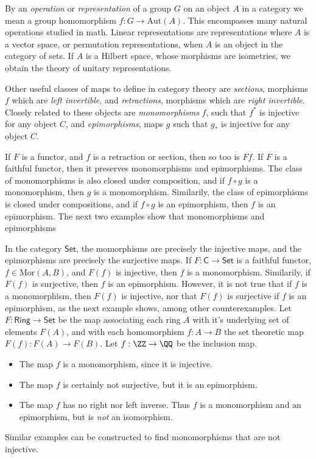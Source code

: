 By an \emph{operation} or \emph{representation} of a group $G$ on an object $A$ in a category we mean a group homomorphism $f: G \to \text{Aut}(A)$. This encompasses many natural operations studied in math. Linear representations are representations where $A$ is a vector space, or permutation representations, when $A$ is an object in the category of sets. If $A$ is a Hilbert space, whose morphisms are isometries, we obtain the theory of unitary representations.

Other useful classes of maps to define in category theory are \emph{sections}, morphisms $f$ which are \emph{left invertible}, and \emph{retractions}, morphisms which are \emph{right invertible}. Closely related to these objects are \emph{monomorphisms} $f$, such that $f^*$ is injective for any object $C$, and \emph{epimorphisms}, maps $g$ such that $g_*$ is injective for any object $C$.

If $F$ is a functor, and $f$ is a retraction or section, then so too is $Ff$. If $F$ is a faithful functor, then it preserves monomorphisms and epimorphisms. The class of monomorphisms is also closed under composition, and if $f \circ g$ is a monomorphism, then $g$ is a monomorphism. Similarily, the class of epimorphisms is closed under compositions, and if $f \circ g$ is an epimorphism, then $f$ is an epimorphism. The next two examples show that monomorphisms and epimorphisms

\begin{example}
    In the category $\mathsf{Set}$, the momorphisms are precisely the injective maps, and the epimorphisms are precisely the surjective maps. If $F: \mathsf{C} \to \mathsf{Set}$ is a faithful functor, $f \in \text{Mor}(A,B)$, and $F(f)$ is injective, then $f$ is a monomorphism. Similarily, if $F(f)$ is surjective, then $f$ is an epimorphism. However, it is not true that if $f$ is a monomorphism, then $F(f)$ is injective, nor that $F(f)$ is surjective if $f$ is an epimorphism, as the next example shows, among other counterexamples. Let $F: \mathsf{Ring} \to \mathsf{Set}$ be the map associating each ring $A$ with it's underlying set of elements $F(A)$, and with each homomorphism $f: A \to B$ the set theoretic map $F(f): F(A) \to F(B)$. Let $f: \ZZ \to \QQ$ be the inclusion map.
    \begin{itemize}
        \item The map $f$ is a monomorphism, since it is injective.
        \item The map $f$ is certainly not surjective, but it is an epimorphism.
        \item The map $f$ has no right nor left inverse. Thus $f$ is a monomorphism and an epimorphism, but is \emph{not} an isomorphism.
    \end{itemize}
    Similar examples can be constructed to find monomorphisms that are not injective.
\end{example}

